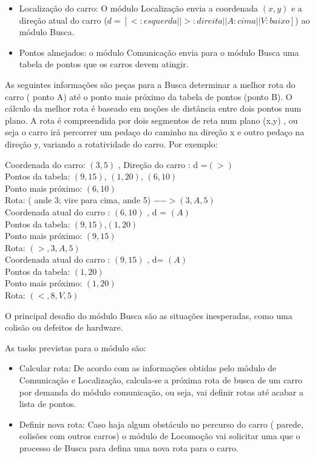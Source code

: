 \documentclass{abnt}
\begin{document}
        \begin{itemize}
            \item Localização do carro: O módulo Localização envia a coordenada  $(x,y)$  e a
        direção atual do carro ($d = { [< : esquerda ||  > : direita || A: cima || V: baixo]}$) ao módulo Busca.
           \item Pontos almejados: o módulo Comunicação envia para o módulo Busca uma tabela de
        pontos que os carros devem atingir.
        \end{itemize}
        As seguintes informações são peças para a Busca determinar a melhor rota do
        carro ( ponto A) até o ponto mais próximo da tabela de pontos (ponto B). O
        cálculo da melhor rota é baseado em noções de distância entre dois pontos num
        plano. A rota é compreendida por dois segmentos de reta num plano (x,y) , ou
        seja o carro irá percorrer um pedaço do caminho na direção x e outro pedaço na
        direção y, variando a rotatividade do carro. Por exemplo:

        Coordenada do carro: $(3,5)$ , Direção do carro : d =$(>)$\\
        Pontos da tabela: $(9, 15)$, $(1,20)$, $(6,10)$\\
        Ponto mais próximo: $(6,10)$\\
        Rota: ( ande 3; vire para cima, ande 5) $--> ( 3 ,A , 5)$\\

        Coordenada atual do carro : $(6,10)$ , d = $(A)$\\
        Pontos da tabela: $(9,15)$,$(1,20)$\\
        Ponto mais próximo: $( 9,15)$\\
        Rota: $( > , 3 , A , 5 )$\\

        Coordenada atual do carro : $(9,15)$ , d= $(A)$\\
        Pontos da tabela: $(1,20)$\\
        Ponto mais próximo: $( 1,20)$\\
        Rota: $( <,8,V, 5)$

        O principal desafio do módulo Busca são as situações inesperadas, como uma
        colisão ou defeitos de hardware.

        As tasks previstas para o módulo são:
        \begin{itemize}
                \item Calcular rota: De acordo com as informações obtidas pelo módulo
                de Comunicação e Localização, calcula-se a próxima rota de
                busca de um carro por demanda do módulo comunicação, ou seja,
                vai definir rotas até acabar a lista de pontos.
                \item Definir nova rota: Caso haja algum obstáculo no percurso do
                carro ( parede, colisões com outros carros) o módulo de
                Locomoção vai solicitar uma que o processo de Busca para defina
                uma nova rota para o carro.
        \end{itemize}
\end{document}
